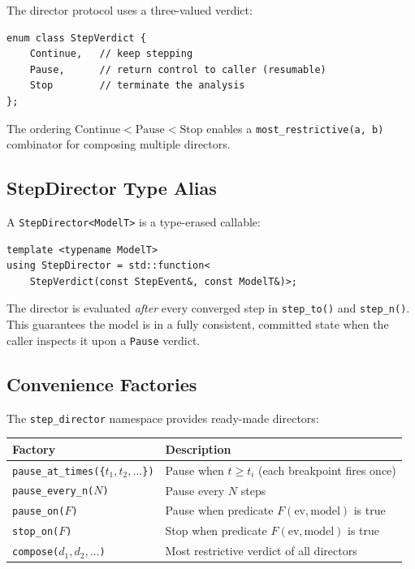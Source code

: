 The director protocol uses a three-valued verdict:

\begin{lstlisting}
enum class StepVerdict {
    Continue,   // keep stepping
    Pause,      // return control to caller (resumable)
    Stop        // terminate the analysis
};
\end{lstlisting}

\noindent
The ordering $\text{Continue} < \text{Pause} < \text{Stop}$ enables a
\texttt{most\_restrictive(a, b)} combinator for composing multiple
directors.

\subsection{StepDirector Type Alias}

A \texttt{StepDirector<ModelT>} is a type-erased callable:

\begin{lstlisting}
template <typename ModelT>
using StepDirector = std::function<
    StepVerdict(const StepEvent&, const ModelT&)>;
\end{lstlisting}

\noindent
The director is evaluated \emph{after} every converged step in
\texttt{step\_to()} and \texttt{step\_n()}.  This guarantees the
model is in a fully consistent, committed state when the caller
inspects it upon a \texttt{Pause} verdict.

\subsection{Convenience Factories}

The \texttt{step\_director} namespace provides ready-made directors:

\begin{center}
\begin{tabular}{ll}
  \toprule
  Factory & Description \\
  \midrule
  \texttt{pause\_at\_times(\{$t_1, t_2, \ldots$\})} &
    Pause when $t \geq t_i$ (each breakpoint fires once) \\
  \texttt{pause\_every\_n($N$)} &
    Pause every $N$ steps \\
  \texttt{pause\_on($F$)} &
    Pause when predicate $F(\text{ev}, \text{model})$ is true \\
  \texttt{stop\_on($F$)} &
    Stop when predicate $F(\text{ev}, \text{model})$ is true \\
  \texttt{compose($d_1, d_2, \ldots$)} &
    Most restrictive verdict of all directors \\
  \bottomrule
\end{tabular}
\end{center}

